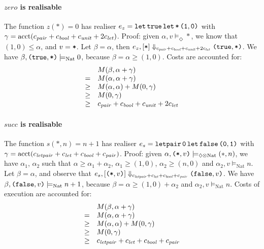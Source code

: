 \documentclass{workingnote}
\newcommand{\account}{\mathrm{acct}}
\newcommand{\TyNat}{\mathrm{Nat}}
\begin{document}
\paragraph{$\mathit{zero}$ is realisable} The function $z(*) = 0$ has
realiser $e_z = \texttt{let}\,\texttt{true}\,\texttt{let}\,\texttt{*}\,\texttt{(}\texttt{1},\texttt{0}\texttt{)}$ with
$\gamma = \account(\cnstPair + \cnstBool + \cnstUnitVal +
2\cnstLet)$. Proof: given $\alpha, v \models_\Diamond *$, we know that
$(1,0) \leq \alpha$, and $v = \texttt{*}$. Let $\beta = \alpha$, then
$e_z, [\texttt{*}] \Downarrow_{c_{\mathit{pair}}+c_{\mathit{bool}}+c_\mathit{unit}+2c_{\mathit{let}}}
\texttt{(}\texttt{true}, \texttt{*}\texttt{)}$. We have
$\beta, \Pair{\True, \Unit} \models_{\TyNat} 0$, because
$\beta = \alpha \geq (1,0)$. Costs are accounted for:
\begin{displaymath}
  \begin{array}{cl}
    &M(\beta, \alpha+\gamma) \\
    =&M(\alpha, \alpha+\gamma) \\
    \geq&M(\alpha,\alpha) + M(0,\gamma) \\
    \geq&M(0,\gamma) \\
    \geq&c_{\mathit{pair}} + c_{\mathit{bool}} + c_\mathit{unit} + 2c_{\mathit{let}}
  \end{array}
\end{displaymath}


\paragraph{$\mathit{succ}$ is realisable} The function $s(*,n) = n+1$
has realiser
$e_s = \texttt{letpair}\,\texttt{0}\,\texttt{let}\,\texttt{false}\,\texttt{(}\texttt{0},\texttt{1}\texttt{)}$ with
$\gamma = \account(\cnstLetPair + \cnstLet + \cnstBool +
\cnstPair)$. Proof: given
$\alpha, \Pair{\Unit,v} \models_{\Diamond \otimes \TyNat} (*,n)$, we
have $\alpha_1$, $\alpha_2$ such that
$\alpha \geq \alpha_1 + \alpha_2$, $\alpha_1 \geq (1,0)$,
$\alpha_2 \geq (n,0)$ and $\alpha_2, v \models_\TyNat n$. Let
$\beta = \alpha$, and observe that
$e_s, [\texttt{(}\texttt{*},v\texttt{)}] \Downarrow_{c_{\mathit{letpair}} + c_{\mathit{let}} + c_{\mathit{bool}}
  + c_{\mathit{pair}}} \texttt{(}\texttt{false},v\texttt{)}$. We have
$\beta, \Pair{\False,v} \models_\TyNat n+1$, because
$\beta = \alpha \geq (1,0) + \alpha_2$ and
$\alpha_2, v \models_\TyNat n$. Costs of execution are accounted for:
\begin{displaymath}
  \begin{array}{cl}
    &M(\beta,\alpha+\gamma) \\
    =&M(\alpha, \alpha+\gamma) \\
    \geq&M(\alpha,\alpha) + M(0,\gamma) \\
    \geq&M(0,\gamma) \\
    \geq&c_{\mathit{letpair}} + c_{\mathit{let}} + c_{\mathit{bool}} + c_{\mathit{pair}}
  \end{array}
\end{displaymath}
\end{document}
